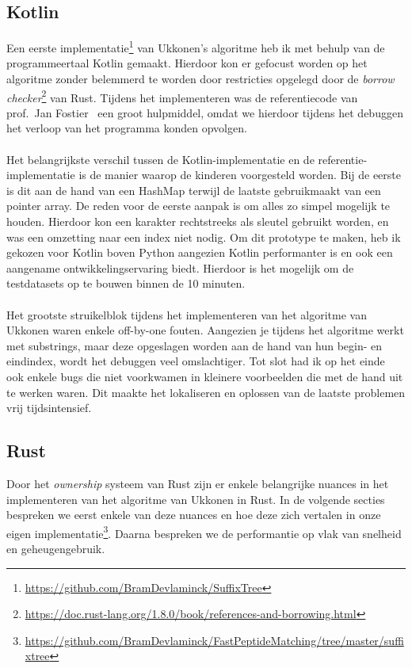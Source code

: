 \subsection{Kotlin}\label{subsec:kotlin}
Een eerste implementatie\footnote{\url{https://github.com/BramDevlaminck/SuffixTree}} van Ukkonen's algoritme heb ik met behulp van de programmeertaal Kotlin gemaakt.
Hierdoor kon er gefocust worden op het algoritme zonder belemmerd te worden door restricties opgelegd door de \textit{borrow checker}\footnote{\url{https://doc.rust-lang.org/1.8.0/book/references-and-borrowing.html}} van Rust.
Tijdens het implementeren was de referentiecode van prof.~Jan Fostier~\cite{Ukkonen_CCB} een groot hulpmiddel, omdat we hierdoor tijdens het debuggen het verloop van het programma konden opvolgen.
\\ \\
Het belangrijkste verschil tussen de Kotlin-implementatie en de referentie-implementatie is de manier waarop de kinderen voorgesteld worden.
Bij de eerste is dit aan de hand van een HashMap terwijl de laatste gebruikmaakt van een pointer array.
De reden voor de eerste aanpak is om alles zo simpel mogelijk te houden.
Hierdoor kon een karakter rechtstreeks als sleutel gebruikt worden, en was een omzetting naar een index niet nodig.
Om dit prototype te maken, heb ik gekozen voor Kotlin boven Python aangezien Kotlin performanter is en ook een aangename ontwikkelingservaring biedt.
Hierdoor is het mogelijk om de testdatasets op te bouwen binnen de 10 minuten.
\\ \\
Het grootste struikelblok tijdens het implementeren van het algoritme van Ukkonen waren enkele off-by-one fouten.
Aangezien je tijdens het algoritme werkt met substrings, maar deze opgeslagen worden aan de hand van hun begin- en eindindex, wordt het debuggen veel omslachtiger.
Tot slot had ik op het einde ook enkele bugs die niet voorkwamen in kleinere voorbeelden die met de hand uit te werken waren.
Dit maakte het lokaliseren en oplossen van de laatste problemen vrij tijdsintensief.

\subsection{Rust}\label{subsec:rust}
Door het \textit{ownership} systeem van Rust zijn er enkele belangrijke nuances in het implementeren van het algoritme van Ukkonen in Rust.
In de volgende secties bespreken we eerst enkele van deze nuances en hoe deze zich vertalen in onze eigen implementatie\footnote{\url{https://github.com/BramDevlaminck/FastPeptideMatching/tree/master/suffixtree}}.
Daarna bespreken we de performantie op vlak van snelheid en geheugengebruik.

